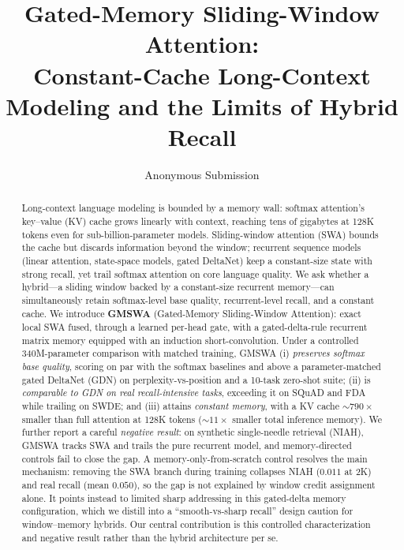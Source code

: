 \documentclass[letterpaper]{article} %
\title{Gated-Memory Sliding-Window Attention:\\
Constant-Cache Long-Context Modeling and the Limits of Hybrid Recall}
\author{Anonymous Submission}
\begin{document}
\maketitle

\begin{abstract}
Long-context language modeling is bounded by a memory wall: softmax attention's key--value (KV) cache grows linearly with context, reaching tens of gigabytes at 128K tokens even for sub-billion-parameter models. Sliding-window attention (SWA) bounds the cache but discards information beyond the window; recurrent sequence models (linear attention, state-space models, gated DeltaNet) keep a constant-size state with strong recall, yet trail softmax attention on core language quality. We ask whether a hybrid---a sliding window backed by a constant-size recurrent memory---can simultaneously retain softmax-level base quality, recurrent-level recall, and a constant cache. We introduce \textbf{GMSWA} (Gated-Memory Sliding-Window Attention): exact local SWA fused, through a learned per-head gate, with a gated-delta-rule recurrent matrix memory equipped with an induction short-convolution. Under a controlled 340M-parameter comparison with matched training, GMSWA (i) \emph{preserves softmax base quality}, scoring on par with the softmax baselines and above a parameter-matched gated DeltaNet (GDN) on perplexity-vs-position and a 10-task zero-shot suite; (ii) is \emph{comparable to GDN on real recall-intensive tasks}, exceeding it on SQuAD and FDA while trailing on SWDE; and (iii) attains \emph{constant memory}, with a KV cache ${\sim}790\times$ smaller than full attention at 128K tokens (${\sim}11\times$ smaller total inference memory). We further report a careful \emph{negative result}: on synthetic single-needle retrieval (NIAH), GMSWA tracks SWA and trails the pure recurrent model, and memory-directed controls fail to close the gap. A memory-only-from-scratch control resolves the main mechanism: removing the SWA branch during training collapses NIAH ($0.011$ at 2K) and real recall (mean $0.050$), so the gap is not explained by window credit assignment alone. It points instead to limited sharp addressing in this gated-delta memory configuration, which we distill into a ``smooth-vs-sharp recall'' design caution for window--memory hybrids. Our central contribution is this controlled characterization and negative result rather than the hybrid architecture per se.
\end{abstract}

\end{document}
